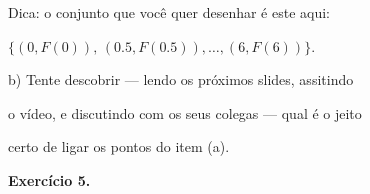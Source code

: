 \documentclass[oneside,12pt]{article}
\begin{document}
Dica: o conjunto que você quer desenhar é este aqui:

$\{(0,F(0)), \, (0.5,F(0.5)), \ldots, (6,F(6))\}$.

\msk

b) Tente descobrir --- lendo os próximos slides, assitindo

o vídeo, e discutindo com os seus colegas --- qual é o jeito

certo de ligar os pontos do item (a).



\newpage


{\bf Exercício 5.}

\end{document}
